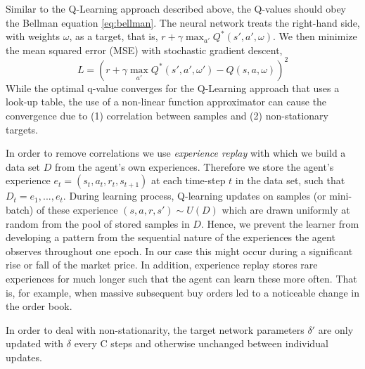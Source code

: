 
Similar to the Q-Learning approach described above, the Q-values should obey the Bellman equation \ref{eq:bellman}.
The neural network treats the right-hand side, with weights $\omega$, as a target, that is, $r+\gamma \max_{a'} Q^*(s',a', \omega)$.
We then minimize the mean squared error (MSE) with stochastic gradient descent,
\begin{equation}
    L=(r+\gamma \max_{a'} Q^*(s',a', \omega') - Q(s,a,\omega))^2
\end{equation}
While the optimal q-value converges for the Q-Learning approach that uses a look-up table, the use of a non-linear function approximator can cause the convergence due to (1) correlation between samples and (2) non-stationary targets.

In order to remove correlations we use \textit{experience replay} with which we build a data set $D$ from the agent's own experiences.
Therefore we store the agent's experience $e_t=(s_t, a_t, r_t, s_{t+1})$ at each time-step $t$ in the data set, such that $D_t = {e_1, ..., e_t}$.
During learning process, Q-learning updates on samples (or mini-batch) of these experience $(s,a,r,s') \sim U(D)$ which are drawn uniformly at random from the pool of stored samples in $D$.
Hence, we prevent the learner from developing a pattern from the sequential nature of the experiences the agent observes throughout one epoch.
In our case this might occur during a significant rise or fall of the market price.
In addition, experience replay stores rare experiences for much longer such that the agent can learn these more often.
That is, for example, when massive subsequent buy orders led to a noticeable change in the order book.

In order to deal with non-stationarity, the target network parameters $\delta'$ are only updated with $\delta$ every C steps and otherwise unchanged between individual updates.
